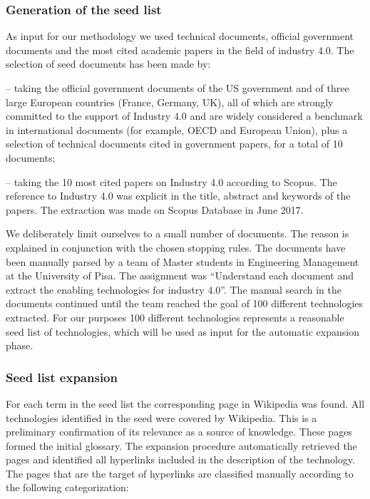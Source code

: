 \documentclass[b5paper,]{book}
\theoremstyle{definition}
\theoremstyle{definition}
\theoremstyle{definition}
\theoremstyle{remark}
\begin{document}
\subsubsection*{Generation of the seed
list}\label{generation-of-the-seed-list}

As input for our methodology we used technical documents, official
government documents and the most cited academic papers in the field of
industry 4.0. The selection of seed documents has been made by:

-- taking the official government documents of the US government and of
three large European countries (France, Germany, UK), all of which are
strongly committed to the support of Industry 4.0 and are widely
considered a benchmark in international documents (for example, OECD and
European Union), plus a selection of technical documents cited in
government papers, for a total of 10 documents;

-- taking the 10 most cited papers on Industry 4.0 according to Scopus.
The reference to Industry 4.0 was explicit in the title, abstract and
keywords of the papers. The extraction was made on Scopus Database in
June 2017.

We deliberately limit ourselves to a small number of documents. The
reason is explained in conjunction with the chosen stopping rules. The
documents have been manually parsed by a team of Master students in
Engineering Management at the University of Pisa. The assignment was
``Understand each document and extract the enabling technologies for
industry 4.0''. The manual search in the documents continued until the
team reached the goal of 100 different technologies extracted. For our
purposes 100 different technologies represents a reasonable seed list of
technologies, which will be used as input for the automatic expansion
phase.

\subsubsection*{Seed list expansion}\label{seed-list-expansion}

For each term in the seed list the corresponding page in Wikipedia was
found. All technologies identified in the seed were covered by
Wikipedia. This is a preliminary confirmation of its relevance as a
source of knowledge. These pages formed the initial glossary. The
expansion procedure automatically retrieved the pages and identified all
hyperlinks included in the description of the technology. The pages that
are the target of hyperlinks are classified manually according to the
following categorization:
\end{document}
